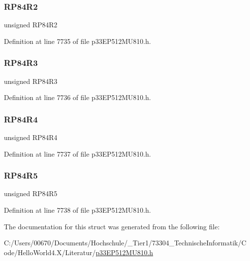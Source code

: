 \subsubsection{\texorpdfstring{R\+P84\+R2}{RP84R2}}
{\footnotesize\ttfamily unsigned R\+P84\+R2}



Definition at line 7735 of file p33\+E\+P512\+M\+U810.\+h.

\mbox{\label{structtag_r_p_o_r5_b_i_t_s_a39cc34fb9710ed039a225ebede2be720}} 
\subsubsection{\texorpdfstring{R\+P84\+R3}{RP84R3}}
{\footnotesize\ttfamily unsigned R\+P84\+R3}



Definition at line 7736 of file p33\+E\+P512\+M\+U810.\+h.

\mbox{\label{structtag_r_p_o_r5_b_i_t_s_ad1d821508b6656f87679efec862b7fa6}} 
\subsubsection{\texorpdfstring{R\+P84\+R4}{RP84R4}}
{\footnotesize\ttfamily unsigned R\+P84\+R4}



Definition at line 7737 of file p33\+E\+P512\+M\+U810.\+h.

\mbox{\label{structtag_r_p_o_r5_b_i_t_s_a7f209bbc75114015e80c1398974394f7}} 
\subsubsection{\texorpdfstring{R\+P84\+R5}{RP84R5}}
{\footnotesize\ttfamily unsigned R\+P84\+R5}



Definition at line 7738 of file p33\+E\+P512\+M\+U810.\+h.



The documentation for this struct was generated from the following file\+:\begin{DoxyCompactItemize}
\item 
C\+:/\+Users/00670/\+Documents/\+Hochschule/\+\_\+\+Tier1/73304\+\_\+\+Technische\+Informatik/\+Code/\+Hello\+World4.\+X/\+Literatur/\hyperlink{p33_e_p512_m_u810_8h}{p33\+E\+P512\+M\+U810.\+h}\end{DoxyCompactItemize}
